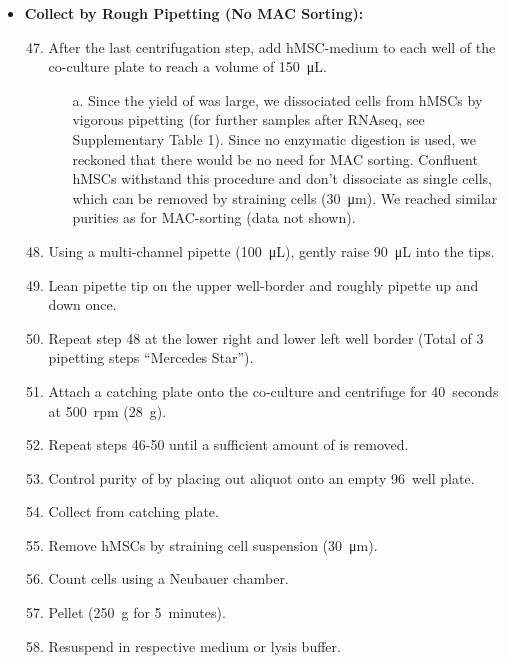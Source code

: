 \begin{itemize}
    \item \textbf{Collect \MAina by Rough Pipetting (No MAC Sorting):}
          \begin{enumerate}
              \setcounter{enumi}{46}
              \item After the last centrifugation step, add hMSC-medium to each well of the co-culture plate to reach a volume of \SI{150}{\micro\liter}.
                    \begin{itemize}
                        \item[a.] Since the yield of \MAina was large, we dissociated \MAina cells from hMSCs by vigorous pipetting (for further samples after RNAseq, see Supplementary Table 1). Since no enzymatic digestion is used, we reckoned that there would be no need for MAC sorting. Confluent hMSCs withstand this procedure and don’t dissociate as single cells, which can be removed by straining cells (\SI{30}{\micro\meter}). We reached similar purities as for MAC-sorting (data not shown).
                    \end{itemize}
              \item Using a multi-channel pipette (\SI{100}{\micro\liter}), gently raise \SI{90}{\micro\liter} into the tips.
              \item Lean pipette tip on the upper well-border and roughly pipette up and down once.
              \item Repeat step 48 at the lower right and lower left well border (Total of 3 pipetting steps “Mercedes Star”).
              \item Attach a catching plate onto the co-culture and centrifuge for \SI{40}{seconds} at \SI{500}{rpm} (\SI{28}{g}).
              \item Repeat steps 46-50 until a sufficient amount of \MAina is removed.
              \item Control purity of \MAina by placing out aliquot onto an empty \SI{96}{well} plate.
              \item Collect \MAina from catching plate.
              \item Remove hMSCs by straining cell suspension (\SI{30}{\micro\meter}).
              \item Count cells using a Neubauer chamber.
              \item Pellet \MAina (\SI{250}{g} for \SI{5}{minutes}).
              \item Resuspend in respective medium or lysis buffer.
          \end{enumerate}
\end{itemize}



